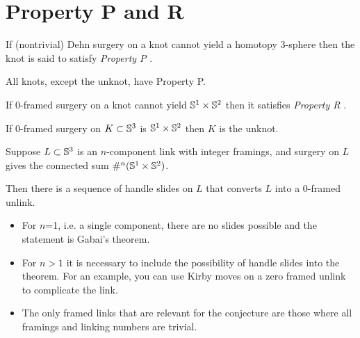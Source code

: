 \newpage
\section{Property P and R}

\begin{definition}
	If (nontrivial) Dehn surgery on a knot
	cannot yield a homotopy $3$-sphere
	then the knot is said to satisfy
	\textit{Property P} .
\end{definition}

\begin{theorem}
	All knots, except the unknot, have Property P.
\end{theorem}

\begin{definition}[Property R]
	If $0$-framed surgery on a knot cannot yield
	$\mathbb{S}^{1} \times \mathbb{S}^{2}$ then it
	satisfies
	\textit{Property R} .
\end{definition}

\begin{theorem}[Gabai]
	If $0$-framed surgery on $K \subset \mathbb{S}^{3}$ is 
	$\mathbb{S}^{1} \times \mathbb{S}^{2}$
	then $K$ is the unknot.
\end{theorem}


\begin{conjecture}
	Suppose $L \subset \mathbb{S}^{3}$ is an $n$-component
	link with integer framings, and surgery on $L$ gives
	the connected sum $ \#^{n} (\mathbb{S}^{1} \times \mathbb{S}^{2}) $.
	
	Then there is a sequence of handle slides on $L$
	that converts $L$ into a $0$-framed unlink.
\end{conjecture}

\begin{remark}
	\begin{itemize}
		\item For $n$=1, i.e. a single component, there are no slides
		possible and the statement is Gabai's theorem.
		
		\item For $n > 1$ it is necessary to include the possibility
		of handle slides into the theorem.
		For an example, you can use Kirby moves
		on a zero framed unlink to complicate the link.
		
		\item The only framed links that are relevant for the
		conjecture are those where all framings and linking
		numbers are trivial.
	\end{itemize}
\end{remark}





